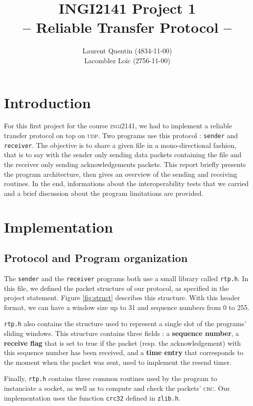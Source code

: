 \documentclass[11pt,a4paper,titlepage]{article}
\title{INGI2141 Project 1\\-- Reliable Transfer Protocol --}
\author{Laurent Quentin (4834-11-00)\\Lacomblez Loïc (2756-11-00)}
\begin{document}
\maketitle

\section*{Introduction}
For this first project for the course \textsc{ingi}2141, we had to implement a reliable transfer protocol on top on \textsc{udp}. Two programs use this protocol : \texttt{sender} and \texttt{receiver}. The objective is to share a given file in a mono-directional fashion, that is to say with the sender only sending data packets containing the file and the receiver only sending acknowledgements packets. This report briefly presents the program architecture, then gives an overview of the sending and receiving routines. In the end, informations about the interoperability tests that we carried and a brief discussion about the program limitations are provided.

\section{Implementation}

\subsection{Protocol and Program organization}
The \texttt{sender} and the \texttt{receiver} programs both use a small library called \texttt{rtp.h}. In this file, we defined the packet structure of our protocol, as specified in the project statement. Figure \ref{fig:struct} describes this structure. With this header format, we can have a window size up to 31 and sequence numbers from 0 to 255.

\texttt{rtp.h} also contains the structure used to represent a single slot of the programs' sliding windows. This structure contains three fields : a \textbf{sequence number}, a \textbf{receive flag} that is set to true if the packet (resp. the acknowledgement) with this sequence number has been received, and a \textbf{time entry} that corresponds to the moment when the packet was sent, used to implement the resend timer.

Finally, \texttt{rtp.h} contains three common routines used by the program to instanciate a socket, as well as to compute and check the packets' \textsc{crc}. Our implementation uses the function \texttt{crc32} defined in \texttt{zlib.h}.
\end{document}
